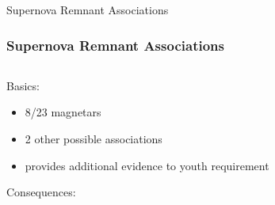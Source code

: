 \documentclass[hyperref=pdftex, presentation]{beamer}
\begin{document}
\begin{frame}{\Large Supernova Remnant Associations}
\frametitle{\Large Supernova Remnant Associations}
	
	\begin{minipage}[0.2\textheight]{\textwidth}
		\begin{columns}[T]
			\begin{column}{0.5\textwidth}
			
				\begin{block}{Basics:}
				
					\begin{itemize}
					 \item<2-> 8/23 magnetars  %
					 \item<3-> 2 other possible associations
					 \item<4-> provides additional evidence to youth requirement
					\end{itemize}
				\end{block}
				\begin{block}{Consequences:}
				

\end{block}
\end{column}
\end{columns}
\end{minipage}
\end{frame}
\end{document}
